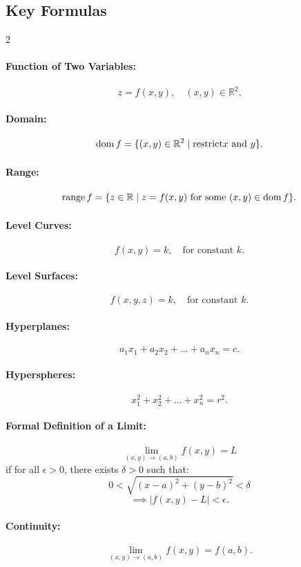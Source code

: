 \subsection*{Key Formulas}
\begin{multicols}{2}
\paragraph{Function of Two Variables:}
\[
z = f(x, y), \quad (x, y) \in \mathbb{R}^2.
\]

\paragraph{Domain:}
\[
\mathrm{dom}\,f = \{(x, y) \in \mathbb{R}^2 \mid \text{restrict} x \text{ and } y \}.
\]

\paragraph{Range:}
\[
\mathrm{range}\, f = \{z \in \mathbb{R} \mid z = f(x, y) \text{ for some } (x, y) \in \mathrm{dom}\,f \}.
\]

\paragraph{Level Curves:}
\[
f(x, y) = k, \quad \text{for constant } k.
\]

\paragraph{Level Surfaces:}
\[
f(x, y, z) = k, \quad \text{for constant } k.
\]
\paragraph{Hyperplanes:}
    \[
    a_1x_1 + a_2x_2 + \dots + a_nx_n = c.
    \]
\paragraph{Hyperspheres:}
    \[
    x_1^2 + x_2^2 + \dots + x_n^2 = r^2.
    \]
\paragraph{Formal Definition of a Limit:}
\[
\lim_{(x, y) \to (a, b)} f(x, y) = L
\]
if for all \( \epsilon > 0 \), there exists \( \delta > 0 \) such that:
\[
0 < \sqrt{(x-a)^2 + (y-b)^2} < \delta 
\]
\[
\implies |f(x, y) - L| < \epsilon.
\]
\paragraph{Continuity:}
\[
\lim_{(x, y) \to (a, b)} f(x, y) = f(a, b).
\]

\end{multicols}
